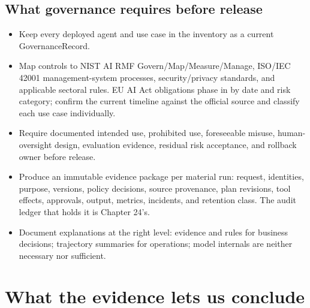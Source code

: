 \subsection{What governance requires before release}

\begin{itemize}

\item Keep every deployed agent and use case in the inventory as a current GovernanceRecord.

\item Map controls to NIST AI RMF Govern/Map/Measure/Manage, ISO/IEC 42001 management-system processes, security/privacy standards, and applicable sectoral rules. EU AI Act obligations phase in by date and risk category; confirm the current timeline against the official source  and classify each use case individually.

\item Require documented intended use, prohibited use, foreseeable misuse, human-oversight design, evaluation evidence, residual risk acceptance, and rollback owner before release.

\item Produce an immutable evidence package per material run: request, identities, purpose, versions, policy decisions, source provenance, plan revisions, tool effects, approvals, output, metrics, incidents, and retention class. The audit ledger that holds it is Chapter 24's.

\item Document explanations at the right level: evidence and rules for business decisions; trajectory summaries for operations; model internals are neither necessary nor sufficient.

\end{itemize}

\section{What the evidence lets us conclude}

